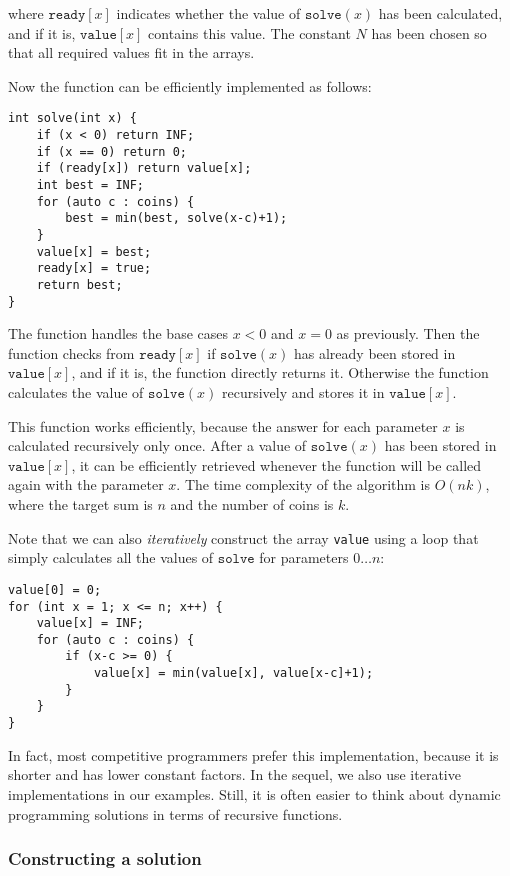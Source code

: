 where $\texttt{ready}[x]$ indicates
whether the value of $\texttt{solve}(x)$ has been calculated,
and if it is, $\texttt{value}[x]$
contains this value.
The constant $N$ has been chosen so
that all required values fit in the arrays.

Now the function can be efficiently
implemented as follows:

\begin{lstlisting}
int solve(int x) {
    if (x < 0) return INF;
    if (x == 0) return 0;
    if (ready[x]) return value[x];
    int best = INF;
    for (auto c : coins) {
        best = min(best, solve(x-c)+1);
    }
    value[x] = best;
    ready[x] = true;
    return best;
}
\end{lstlisting}

The function handles the base cases
$x<0$ and $x=0$ as previously.
Then the function checks from
$\texttt{ready}[x]$ if
$\texttt{solve}(x)$ has already been stored
in $\texttt{value}[x]$,
and if it is, the function directly returns it.
Otherwise the function calculates the value
of $\texttt{solve}(x)$
recursively and stores it in $\texttt{value}[x]$.

This function works efficiently,
because the answer for each parameter $x$
is calculated recursively only once.
After a value of $\texttt{solve}(x)$ has been stored in $\texttt{value}[x]$,
it can be efficiently retrieved whenever the
function will be called again with the parameter $x$.
The time complexity of the algorithm is $O(nk)$,
where the target sum is $n$ and the number of coins is $k$.

Note that we can also \emph{iteratively}
construct the array \texttt{value} using
a loop that simply calculates all the values
of $\texttt{solve}$ for parameters $0 \ldots n$:
\begin{lstlisting}
value[0] = 0;
for (int x = 1; x <= n; x++) {
    value[x] = INF;
    for (auto c : coins) {
        if (x-c >= 0) {
            value[x] = min(value[x], value[x-c]+1);
        }
    }
}
\end{lstlisting}

In fact, most competitive programmers prefer this
implementation, because it is shorter and has
lower constant factors.
In the sequel, we also use iterative implementations
in our examples.
Still, it is often easier to think about
dynamic programming solutions
in terms of recursive functions.


\subsubsection{Constructing a solution}

